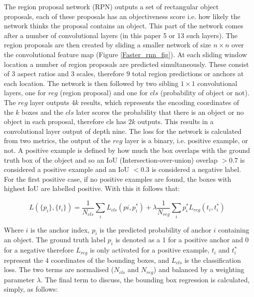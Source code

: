 \documentclass[11pt,twoside]{report}
\begin{document}
The region proposal network (RPN) outputs a set of rectangular object proposals, each of these proposals has an objectiveness score i.e. how likely the network thinks the proposal contains an object. This part of the network comes after a number of convolutional layers (in this paper 5 or 13 such layers). The region proposals are then created by sliding a smaller network of size $n \times n$ over the convolutional feature map (Figure \ref{Faster_rnn_fig}). At each sliding window location a number of region proposals are predicted simultaneously. These consist of 3 aspect ratios and 3 scales, therefore 9 total region predictions or anchors at each location. The network is then followed by two sibling $1 \times 1$ convolutional layers, one for $reg$ (region proposal) and one for $cls$ (probability of object or not). The $reg$ layer outputs 4$k$ results, which represents the encoding coordinates of the $k$ boxes and the $cls$ later scores the probability that there is an object or no object in each proposal, therefore cls has $2k$ outputs. This results in a convolutional layer output of depth nine.
\newline \newline
The loss for the network is calculated from two metrics, the output of the $reg$ layer is a binary, i.e. positive example, or not. A positive example is defined by how much the box overlaps with the ground truth box of the object and so an IoU (Intersection-over-union) overlap $> 0.7$ is considered a positive example and an IoU $< 0.3$ is considered a negative label. For the first positive case, if no positive examples are found, the boxes with highest IoU  are labelled positive. With this it follows that:

\begin{equation}
\label{multi-task_loss_fast_rcnn}
L(\{p_{i}\},\{t_{i}\}) = \frac{1}{N_{cls}} \sum_{i} L_{cls}(p{i},p_{i}^{*}) + \lambda \frac{1}{N_{reg}} \sum_{i}p_{i}^{*} L_{reg}(t_{i},t_{i}^{*})
\end{equation}

Where $i$ is the anchor index, $p_{i}$ is the predicted probability of anchor $i$ containing an object. The ground truth label $p_{i}$ is denoted as a 1 for a positive anchor and 0 for a negative therefore $L_{reg}$ is only activated for a positive example, $t_{i}$ and $t_{i}^{*}$ represent the 4 coordinates of the bounding boxes, and $L_{cls}$ is the classification loss. The two terms are normalised ($N_{cls}$ and $N_{reg}$) and balanced by a weighting parameter $\lambda$. The final term to discuss, the bounding box regression is calculated, simply, as follows:
\end{document}
